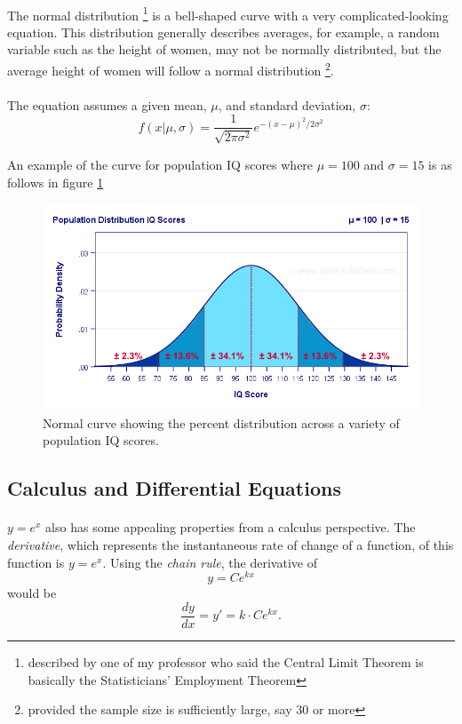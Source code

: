 \documentclass{cup-pan}
\begin{document}
\paragraph{} The normal distribution \footnote{described by one of my professor who said the Central Limit Theorem is basically the Statisticians' Employment Theorem} is a bell-shaped curve with a very complicated-looking equation. This distribution generally describes averages, for example, a random variable such as the height of women, may not be normally distributed, but the average height of women will follow a normal distribution \footnote{provided the sample size is sufficiently large, say 30 or more}.

\paragraph{} The equation assumes a given mean, $\mu$, and standard deviation, $\sigma$:
$$f(x | \mu, \sigma) = \frac{1}{\sqrt{2 \pi \sigma^2}} \textit{e}^{-(x - \mu)^2 / 2 \sigma^2}$$

An example of the curve for population IQ scores where $\mu = 100$ and $\sigma = 15$ is as follows in figure \ref{fig:norm}

\begin{figure}[h!]
\centering
 \includegraphics[scale = .4]{norm_dist.png}

\caption{Normal curve showing the percent distribution across a variety of population IQ scores.}
\label{fig:norm}
\end{figure}

\subsection{Calculus and Differential Equations}

\paragraph{}
$y = \textit{e}^x$ also has some appealing properties from a calculus perspective. The \textit{derivative}, which represents the instantaneous rate of change of a function, of this function is $y = \textit{e}^x.$ Using the \textit{chain rule}, the derivative of $$y = C\textit{e}^{kx}$$ would be $$\frac{dy}{dx} = y' = k \cdot C \textit{e}^{kx}.$$
\end{document}
